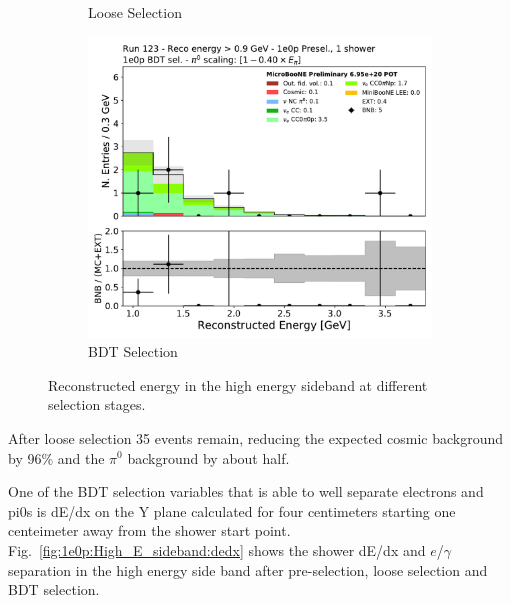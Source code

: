 \begin{figure}[H]
\begin{subfigure}{0.3\textwidth}
    \caption{Loose Selection}
    \end{subfigure}
    \begin{subfigure}{0.3\textwidth}
    \includegraphics[width=1.0\textwidth]{1e0p/High_E_Sideband/BDT_selection/reco_e_highe.pdf}
    \caption{BDT Selection}
    \end{subfigure}
    \caption{Reconstructed energy in the high energy sideband at different selection stages.} 
    \label{fig:1e0p:High_E_sideband:reco_e}
\end{figure}

After loose selection 35 events remain, reducing the expected cosmic background by 96\% and the $\pi^{0}$ background by about half.  

One of the BDT selection variables that is able to well separate electrons and pi0s is dE/dx on the Y plane calculated for four centimeters starting one centeimeter away from the shower start point. Fig.~\ref{fig:1e0p:High_E_sideband:dedx} shows the shower dE/dx and $e$/$\gamma$ separation in the high energy side band after pre-selection, loose selection and BDT selection.

